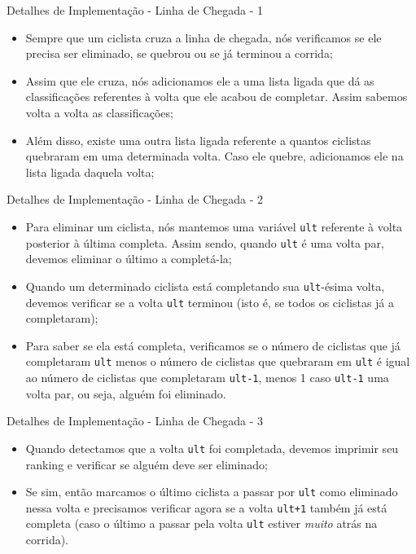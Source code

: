 \documentclass[10pt]{beamer}
\begin{document}
    \begin{frame}{Detalhes de Implementação - Linha de Chegada - 1}
      \begin{itemize}
        \justifying
      \item Sempre que um ciclista cruza a linha de chegada, nós verificamos se
        ele precisa ser eliminado, se quebrou ou se já terminou a corrida;
      \item Assim que ele cruza, nós adicionamos ele a uma lista ligada que dá
        as classificações referentes à volta que ele acabou de completar. Assim
        sabemos volta a volta as classificações;
      \item Além disso, existe uma outra lista ligada referente a quantos
        ciclistas quebraram em uma determinada volta. Caso ele quebre,
        adicionamos ele na lista ligada daquela volta;
      \end{itemize}
    \end{frame}

    \begin{frame}{Detalhes de Implementação - Linha de Chegada - 2}
      \begin{itemize}
        \justifying
      \item Para eliminar um ciclista, nós mantemos uma variável \texttt{ult}
        referente à volta posterior à última completa. Assim sendo, quando
        \texttt{ult} é uma volta par, devemos eliminar o último a completá-la;

      \item Quando um determinado ciclista está completando sua
        \texttt{ult}-ésima volta, devemos verificar se a volta \texttt{ult}
        terminou (isto é, se todos os ciclistas já a completaram);

      \item Para saber se ela está completa, verificamos se o número de
        ciclistas que já completaram \texttt{ult} menos o número de ciclistas
        que quebraram em \texttt{ult} é igual ao número de ciclistas que
        completaram \texttt{ult-1}, menos 1 caso \texttt{ult-1} uma volta par,
        ou seja, alguém foi eliminado.
      \end{itemize}
    \end{frame}

    \begin{frame}{Detalhes de Implementação - Linha de Chegada - 3}
      \begin{itemize}
        \justifying
      \item Quando detectamos que a volta \texttt{ult} foi completada, devemos
        imprimir seu ranking e verificar se alguém deve ser eliminado;
      \item Se sim, então marcamos o último ciclista a passar por \texttt{ult}
        como eliminado nessa volta e precisamos verificar agora se a volta
        \texttt{ult+1} também já está completa (caso o último a passar
        pela volta \texttt{ult} estiver \textit{muito} atrás na corrida).
      \end{itemize}
    \end{frame}
\end{document}
